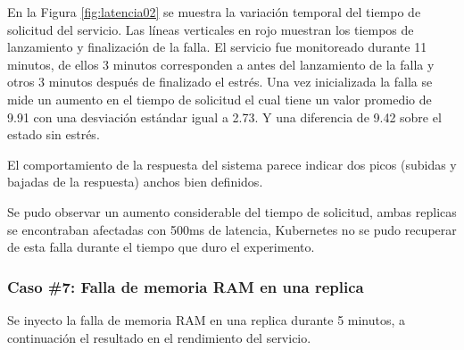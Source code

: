 
\par En la Figura \ref{fig:latencia02} se muestra la variación temporal del tiempo de solicitud del servicio. Las líneas verticales en rojo muestran los tiempos de lanzamiento y finalización de la falla. El servicio fue monitoreado durante 11 minutos, de ellos 3 minutos corresponden a antes del lanzamiento de la falla y otros 3 minutos después de finalizado el estrés. Una vez inicializada la falla se mide un aumento en el tiempo de solicitud el cual tiene un valor promedio de 9.91 con una desviación estándar igual a 2.73. Y una diferencia de 9.42 sobre el estado sin estrés.\\

\par El comportamiento de la respuesta del sistema parece indicar dos picos (subidas y bajadas de la respuesta) anchos bien definidos. \\

\par Se pudo observar un aumento considerable del tiempo de solicitud, ambas replicas se encontraban afectadas con 500ms de latencia, Kubernetes no se pudo recuperar de esta falla durante el tiempo que duro el experimento.\\


\subsubsection{Caso \#7: Falla de memoria RAM en una replica}

\par Se inyecto la falla de memoria RAM en una replica durante 5 minutos, a continuación el resultado en el rendimiento del servicio.\\

